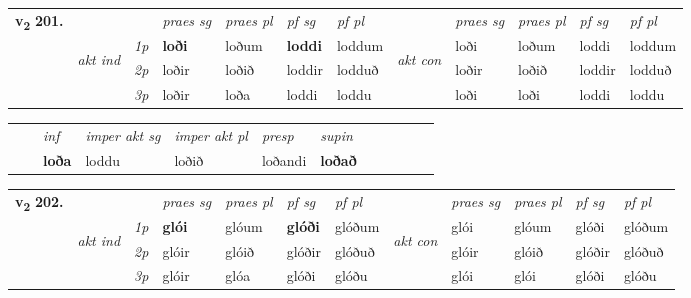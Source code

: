 \begin{tabular}{llllllllllll} \toprule
\multirow{4}{*}{{{\textbf{v{\textsubscript{2}}} \Large{\textbf{201.}}}}}  & &   &  \textit{praes sg}  & \textit{praes pl}  &\textit{ pf sg} & \textit{pf pl} &  &  \textit{praes sg}  & \textit{praes pl}  & \textit{pf sg} & \textit{pf pl } \\*
	\cmidrule{4-7} \cmidrule{9-12}
 & \multirow{3}{*}{\begin{turn}{90}\textit{akt ind}\end{turn}} & {\textit{1p}} & \textbf{loði} & loðum    & \textbf{loddi} & loddum & \multirow{3}{*}{\begin{turn}{90}\textit{akt con}\end{turn}} &loði & loðum & loddi & loddum\\*
& &  {\textit{2p}} &  loðir  & loðið   & loddir & lodduð & & loðir & loðið & loddir & lodduð \\*
& &  {\textit{3p}} & loðir & loða   & loddi & loddu & & loði & loði& loddi & loddu  \\*
\cmidrule{4-7} \cmidrule{9-12}
\end{tabular}


\begin{tabular}{llllllllllll}
 & & \textit{inf} & \textit{imper akt sg} & \textit{imper akt pl}   & \textit{presp} & \textit{supin}       \\*
  & & \textbf{loða} & loddu  & loðið   & loðandi &  \textbf{loðað}   \\*
\cmidrule{1-12}
\end{tabular}



\begin{tabular}{llllllllllll} \toprule
\multirow{4}{*}{{{\textbf{v{\textsubscript{2}}} \Large{\textbf{202.}}}}}  & &   &  \textit{praes sg}  & \textit{praes pl}  &\textit{ pf sg} & \textit{pf pl} &  &  \textit{praes sg}  & \textit{praes pl}  & \textit{pf sg} & \textit{pf pl } \\*
	\cmidrule{4-7} \cmidrule{9-12}
 & \multirow{3}{*}{\begin{turn}{90}\textit{akt ind}\end{turn}} & {\textit{1p}} & \textbf{glói} & glóum    & \textbf{glóði} & glóðum & \multirow{3}{*}{\begin{turn}{90}\textit{akt con}\end{turn}} &glói & glóum & glóði & glóðum\\*
& &  {\textit{2p}} &  glóir  & glóið   & glóðir & glóðuð & & glóir & glóið & glóðir & glóðuð \\*
& &  {\textit{3p}} & glóir & glóa   & glóði & glóðu & & glói & glói& glóði & glóðu  \\*
\cmidrule{4-7} \cmidrule{9-12}
\end{tabular}


